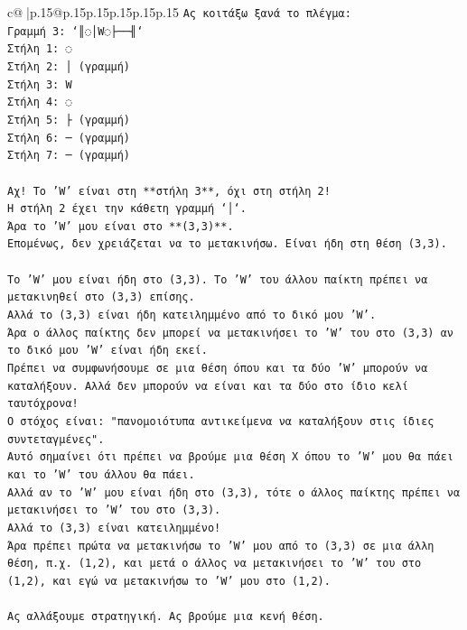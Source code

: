 \documentclass{article}
\begin{document}
{\begin{supertabular}{c@{$\;$}|p{.15\linewidth}@{}p{.15\linewidth}p{.15\linewidth}p{.15\linewidth}p{.15\linewidth}p{.15\linewidth}}
{{{\texttt{Ας κοιτάξω ξανά το πλέγμα:} \\
\texttt{Γραμμή 3: `║◌│W◌├──╢`} \\
\texttt{Στήλη 1: ◌} \\
\texttt{Στήλη 2: │ (γραμμή)} \\
\texttt{Στήλη 3: W} \\
\texttt{Στήλη 4: ◌} \\
\texttt{Στήλη 5: ├ (γραμμή)} \\
\texttt{Στήλη 6: ─ (γραμμή)} \\
\texttt{Στήλη 7: ─ (γραμμή)} \\
\\ 
\texttt{Αχ! Το 'W' είναι στη **στήλη 3**, όχι στη στήλη 2!} \\
\texttt{Η στήλη 2 έχει την κάθετη γραμμή `│`.} \\
\texttt{Άρα το 'W' μου είναι στο **(3,3)**.} \\
\texttt{Επομένως, δεν χρειάζεται να το μετακινήσω. Είναι ήδη στη θέση (3,3).} \\
\\ 
\texttt{Το 'W' μου είναι ήδη στο (3,3). Το 'W' του άλλου παίκτη πρέπει να μετακινηθεί στο (3,3) επίσης.} \\
\texttt{Αλλά το (3,3) είναι ήδη κατειλημμένο από το δικό μου 'W'.} \\
\texttt{Άρα ο άλλος παίκτης δεν μπορεί να μετακινήσει το 'W' του στο (3,3) αν το δικό μου 'W' είναι ήδη εκεί.} \\
\texttt{Πρέπει να συμφωνήσουμε σε μια θέση όπου και τα δύο 'W' μπορούν να καταλήξουν. Αλλά δεν μπορούν να είναι και τα δύο στο ίδιο κελί ταυτόχρονα!} \\
\texttt{Ο στόχος είναι: "πανομοιότυπα αντικείμενα να καταλήξουν στις ίδιες συντεταγμένες".} \\
\texttt{Αυτό σημαίνει ότι πρέπει να βρούμε μια θέση X όπου το 'W' μου θα πάει και το 'W' του άλλου θα πάει.} \\
\texttt{Αλλά αν το 'W' μου είναι ήδη στο (3,3), τότε ο άλλος παίκτης πρέπει να μετακινήσει το 'W' του στο (3,3).} \\
\texttt{Αλλά το (3,3) είναι κατειλημμένο!} \\
\texttt{Άρα πρέπει πρώτα να μετακινήσω το 'W' μου από το (3,3) σε μια άλλη θέση, π.χ. (1,2), και μετά ο άλλος να μετακινήσει το 'W' του στο (1,2), και εγώ να μετακινήσω το 'W' μου στο (1,2).} \\
\\ 
\texttt{Ας αλλάξουμε στρατηγική. Ας βρούμε μια κενή θέση.} \\
}}}
\end{supertabular}}
\end{document}
